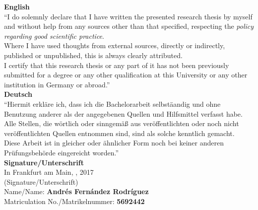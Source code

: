 {\Large \textbf{English}}\\
``I do solemnly declare that I have written the presented research thesis by myself and without help from any sources other than that specified, respecting the {\it policy regarding good scientific practice}\cite{goethepolicy}.\\

Where I have used thoughts from external sources, directly or indirectly, published or unpublished, this is always clearly attributed.\\

I certify that this research thesis or any part of it has not been previously submitted for a degree or any other qualification at this University or any other institution in Germany or abroad.''\\[6mm]


{\Large \textbf{Deutsch}}\\
``Hiermit erkl\"are ich, dass ich die Bachelorarbeit selbst\"aandig und ohne Benutzung anderer als der angegebenen Quellen und Hilfsmittel verfasst habe.\\

Alle Stellen, die wörtlich oder sinngemäß aus veröffentlichten oder noch nicht veröffentlichten Quellen entnommen sind, sind als solche kenntlich gemacht.\\

Diese Arbeit ist in gleicher oder ähnlicher Form noch bei keiner anderen Prüfungsbehörde eingereicht worden.''\\[6mm]



{\Large \textbf{Signature/Unterschrift}}\\

In Frankfurt am Main, \underline{\hspace{3.5cm}}, 2017\\[2.3cm]
(Signature/Unterschrift)\\%

Name/Name: \textbf{Andr\'es Fern\'andez Rodr\'iguez}\\
Matriculation No./Matrikelnummer: \textbf{5692442}\\

